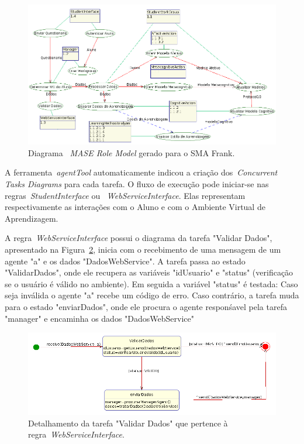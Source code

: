 \begin{figure}
	\centering
	\includegraphics[scale=0.48]{images/mase-role-model.png}
	\caption{Diagrama ~\emph{MASE Role Model} gerado para o SMA Frank.}
	\label{fig:frank-role-model}
\end{figure}

A ferramenta~\emph{agentTool} automaticamente indicou a criação dos~\emph{Concurrent Tasks Diagrams} para cada tarefa. O fluxo de execução pode iniciar-se nas regras~\emph{StudentInterface} ou ~\emph{WebServiceInterface}. Elas representam respectivamente as interações com o Aluno e com o Ambiente Virtual de Aprendizagem.

A regra~\emph{WebServiceInterface} possui o diagrama da tarefa "Validar Dados", apresentado na Figura~\ref{fig:validar-dados}, inicia com o recebimento de uma mensagem de um agente "a" e os dados "DadosWebService". A tarefa passa ao estado "ValidarDados", onde ele recupera as variáveis "idUsuario" e "status" (verificação se o usuário é válido no ambiente). Em seguida a variável "status" é testada: Caso seja inválida o agente "a" recebe um código de erro. Caso contrário, a tarefa muda para o estado "enviarDados", onde ele procura o agente responśavel pela tarefa "manager" e encaminha os dados "DadosWebService"
 
\begin{figure}
	\centering
	\includegraphics[scale=0.48]{images/td-validar-dados.png}
	\caption{Detalhamento da tarefa "Validar Dados" que pertence à regra~\emph{WebServiceInterface}.}
	\label{fig:validar-dados}
\end{figure}

